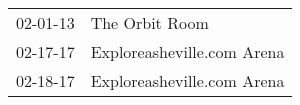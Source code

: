 \begin{supertabular}{p{0.25\columnwidth}p{0.75\columnwidth}}
 02-01-13 &              The Orbit Room \\
 02-17-17 &  Exploreasheville.com Arena \\
 02-18-17 &  Exploreasheville.com Arena \\
\end{supertabular}
